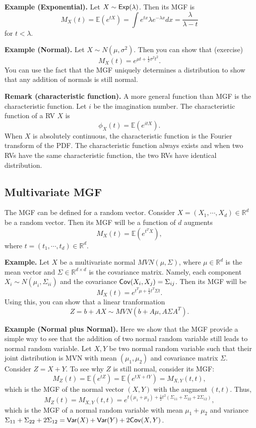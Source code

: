 \documentclass[twoside]{article}
\newcommand\E{\mathbb{E}}
\begin{document}
{\bf Example (Exponential). }
Let $X\sim {\sf Exp}(\lambda)$. 
Then its MGF is 
$$
M_X(t) = \E(e^{tX}) = \int e^{tx} \lambda e^{-\lambda x}dx = \frac{\lambda}{\lambda-t}
$$
for $t<\lambda$.


{\bf Example (Normal). }
Let $X\sim N(\mu,\sigma^2)$.
Then you can show that (exercise)
$$
M_X(t) = e^{\mu t + \frac{1}{2}\sigma^2t^2}.
$$
You can  use the fact that the MGF uniquely determines a distribution to show that 
any addition of normals is still normal.




{\bf Remark (characteristic function).}
A more general function than MGF is the characteristic function.
Let $i$ be the imagination number. 
The characteristic function of a RV $X$ is
$$
\phi_X(t) = \E(e^{itX}).
$$
When $X$ is absolutely continuous, the characteristic function is the Fourier transform
of the PDF. 
The characteristic function always exists and
when two RVs have the same characteristic function,
the two RVs have identical distribution. 



\subsection{Multivariate MGF}
The MGF can be defined for a random vector. 
Consider $X = (X_1,\cdots, X_d)\in \mathbb{R}^d$ be a random vector.
Then its MGF will be a function of $d$ augments
$$
M_X(t) = \E(e^{t^TX}),
$$
where $t= (t_1,\cdots, t_d) \in \mathbb{R}^d$.



{\bf Example.}
Let $X$ be a multivariate normal $MVN(\mu,\Sigma)$,
where $\mu\in\mathbb{R}^d$ is the mean vector
and $\Sigma\in \mathbb{R}^{d\times d}$ is the covariance matrix.
Namely, each component $X_i\sim N(\mu_i, \Sigma_{ii})$ 
and the covariance ${\sf Cov}(X_i,X_j) = \Sigma_{ij}$.
Then its MGF will be 
$$
M_X(t) = e^{t^T\mu+\frac{1}{2}t^T\Sigma t}.
$$
Using this, you can show that 
a linear tranformation
$$
Z = b+AX \sim MVN(b+A\mu, A\Sigma A^T).
$$


{\bf Example (Normal plus Normal). }
Here we show that the MGF provide a simple way to see that the addition of two normal random variable still leads to normal random variable. 
Let $X,Y$ be two normal random variable such that their joint distribution is MVN with mean $(\mu_1,\mu_2)$ and covariance matrix $\Sigma$. 
Consider $Z=X+Y$. 
To see why $Z$ is still normal, consider its MGF:
$$
M_Z(t) = \E(e^{tZ}) = \E(e^{tX+tY}) = M_{X,Y}(t,t),
$$
which is the MGF of the normal vector $(X,Y)$ with the augment $(t,t)$. 
Thus,
$$
M_Z(t)  = M_{X,Y}(t,t) = e^{t(\mu_1+\mu_2) + \frac{1}{2}t^2(\Sigma_{11}+\Sigma_{22}+2\Sigma_{12})},
$$
which is the MGF of a normal random variable with mean $\mu_1+\mu_2$ and variance $\Sigma_{11}+\Sigma_{22}+2\Sigma_{12} = {\sf Var}(X)+{\sf Var}(Y)+2{\sf Cov}(X,Y)$.
\end{document}
